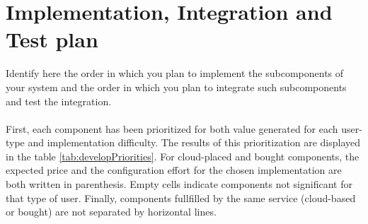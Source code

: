 \documentclass{article}
\begin{document}
\section{Implementation, Integration and Test plan}	Identify 	here	the	order	in	which	you	plan	
to	implement	the	subcomponents	of	your	system	and	the	order	in	which	you	plan	to	integrate	
such	subcomponents	and	test	the	integration.	\\\\
First, each component has been prioritized for both value generated for each user-type and implementation difficulty. The results of this prioritization are displayed in the table \ref{tab:developPriorities}. For cloud-placed and bought components, the expected price and the configuration effort for the chosen implementation are both written in parenthesis. Empty cells indicate components not significant for that type of user. Finally, components fullfilled by the same service (cloud-based or bought) are not separated by horizontal lines.
\end{document}
